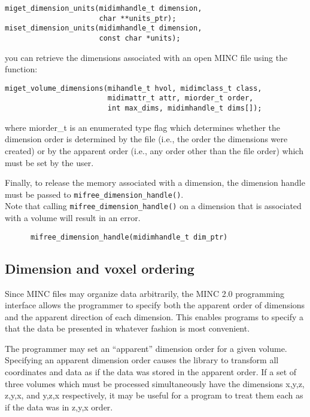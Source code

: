 \documentclass{article}
\begin{document}
\begin{verbatim}
miget_dimension_units(midimhandle_t dimension, 
                      char **units_ptr);
miset_dimension_units(midimhandle_t dimension, 
                      const char *units);
\end{verbatim}

you can retrieve the dimensions associated with an open MINC file using
the function:\\

\begin{verbatim}
miget_volume_dimensions(mihandle_t hvol, midimclass_t class,
                        midimattr_t attr, miorder_t order,
                        int max_dims, midimhandle_t dims[]);
\end{verbatim}
   
where miorder\_t is an enumerated type flag which determines whether the
dimension order is determined by the file (i.e., the order the dimensions
were created) or by the apparent order (i.e., any order other than the file
order) which must be set by the user.       
     
Finally, to release the memory associated with a dimension, 
the dimension handle must be passed to {\tt mifree\_dimension\_handle()}.\\
Note that calling {\tt mifree\_dimension\_handle()} on a 
dimension that is associated with a volume will result in an error. 

\begin{verbatim}
      mifree_dimension_handle(midimhandle_t dim_ptr)
\end{verbatim}
\subsection{Dimension and voxel ordering}
Since MINC files may organize data arbitrarily, the MINC 2.0
programming interface allows the programmer to specify both the
apparent order of dimensions and the apparent direction of each
dimension.  This enables programs to specify a that the data be
presented in whatever fashion is most convenient.

The programmer may set an ``apparent'' dimension order for a given
volume.  Specifying an apparent dimension order causes the library to
transform all coordinates and data as if the data was stored in the
apparent order. If a set of three volumes which must be processed
simultaneously have the dimensions x,y,z, z,y,x, and y,z,x
respectively, it may be useful for a program to treat them each as if
the data was in z,y,x order.
\end{document}
